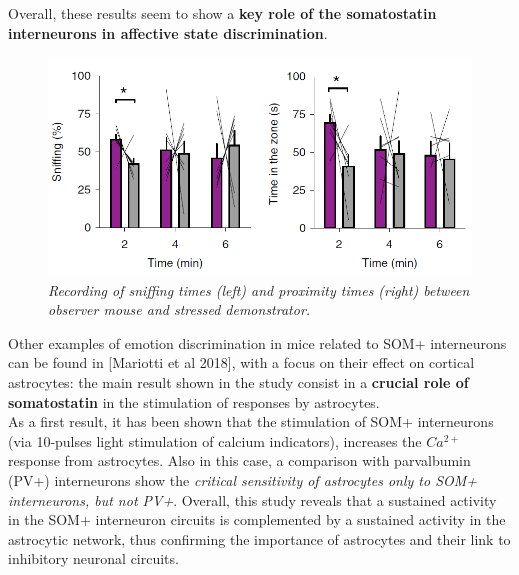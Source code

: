 \documentclass[12pt, a4paper]{article}
\begin{document}
 Overall, these results seem to show a \textbf{key role of the somatostatin interneurons in affective state discrimination}.

	\begin{figure}
	\begin{center}
		\includegraphics[scale=.99]{scheggia.png} 
	\end{center} 
	\caption{\textit{Recording of sniffing times (left) and proximity times (right) between observer mouse and stressed demonstrator.}} \label{Scheggia}
	
\end{figure}


Other examples of emotion discrimination in mice related to SOM+ interneurons can be found in [Mariotti et al 2018], with a focus on their effect on cortical astrocytes: the main result shown in the study consist in a \textbf{crucial role of somatostatin} in the stimulation of responses by astrocytes.\\
As a first result, it has been shown that the stimulation of SOM+ interneurons (via 10-pulses light stimulation of calcium indicators), increases the $Ca^{2+}$ response from astrocytes. Also in this case, a comparison with parvalbumin (PV+) interneurons show the \textit{critical sensitivity of astrocytes only to SOM+ interneurons, but not PV+}. Overall, this study reveals that a sustained activity in the SOM+ interneuron circuits is complemented by
a sustained activity in the astrocytic network, thus confirming the importance of astrocytes and their link to inhibitory neuronal circuits. 
\\
\end{document}
